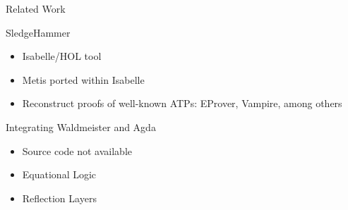 \documentclass[xetex, hyperref={pdfpagelabels=false}]{beamer}
\begin{document}
\begin{frame}[fragile, label=hammer]{Related Work}
\begin{block}{SledgeHammer}
\begin{itemize}
\item Isabelle/HOL tool
\item Metis ported within Isabelle
\item Reconstruct proofs of well-known ATPs: EProver, Vampire, among others
\end{itemize}
\end{block}

\begin{block}{Integrating Waldmeister and Agda}
\begin{itemize}
  \item Source code not available
  \item Equational Logic
  \item Reflection Layers
  \end{itemize}
\end{block}
\end{frame}
\end{document}
